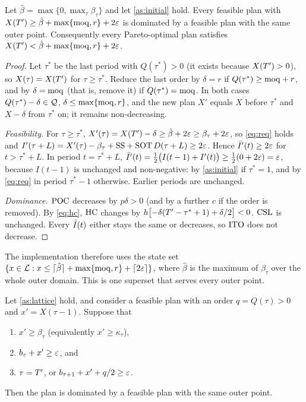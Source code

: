 \begin{lemma}\label{lem:ub}
  Let $\hat\beta=\max\{0,\max_\tau\beta_\tau\}$ and let \cref{as:initial} hold. Every
  feasible plan with $X(T')\ge\hat\beta+\max\{\mathrm{moq},r\}+2\varepsilon$ is dominated by a feasible
  plan with the same outer point. Consequently every Pareto-optimal plan satisfies
  $X(T')<\hat\beta+\max\{\mathrm{moq},r\}+2\varepsilon$.
\end{lemma}

\begin{proof}
  Let $\tau^\ast$ be the last period with $Q(\tau^\ast)>0$ (it exists because
  $X(T')>0$), so $X(\tau)=X(T')$ for $\tau\ge\tau^\ast$. Reduce the last order by
  $\delta=r$ if $Q(\tau^\ast)\ge\mathrm{moq}+r$, and by $\delta=\mathrm{moq}$ (that is, remove it) if
  $Q(\tau^\ast)=\mathrm{moq}$. In both cases $Q(\tau^\ast)-\delta\in\mathcal{Q}$, $\delta\le\max\{\mathrm{moq},r\}$,
  and the new plan $X'$ equals $X$ before $\tau^\ast$ and $X-\delta$ from $\tau^\ast$ on;
  it remains non-decreasing.

  \emph{Feasibility.} For $\tau\ge\tau^\ast$,
  $X'(\tau)=X(T')-\delta\ge\hat\beta+2\varepsilon\ge\beta_\tau+2\varepsilon$, so \eqref{eq:req} holds and
  $I'(\tau+L)=X'(\tau)-\beta_\tau+\mathrm{SS}+\mathrm{SOT}\,D(\tau+L)\ge 2\varepsilon$. Hence
  $\bar I'(t)\ge2\varepsilon$ for $t>\tau^\ast+L$. In period $t=\tau^\ast+L$,
  $\bar I'(t)=\tfrac12\bigl(I(t-1)+I'(t)\bigr)\ge\tfrac12(0+2\varepsilon)=\varepsilon$, because $I(t-1)$
  is unchanged and non-negative: by \cref{as:initial} if $\tau^\ast=1$, and by
  \eqref{eq:req} in period $\tau^\ast-1$ otherwise. Earlier periods are unchanged.

  \emph{Dominance.} $\mathrm{POC}$ decreases by $p\delta>0$ (and by a further $c$ if the order is
  removed). By \eqref{eq:hc}, $\mathrm{HC}$ changes by
  $h\bigl[-\delta(T'-\tau^\ast+1)+\delta/2\bigr]<0$. $\mathrm{CSL}$ is unchanged. Every
  $\bar I(t)$ either stays the same or decreases, so $\mathrm{ITO}$ does not decrease.
\end{proof}

The implementation therefore uses the state set
$\{x\in\mathcal{L} : x\le\lceil\hat\beta\rceil+\max\{\mathrm{moq},r\}+\lceil2\varepsilon\rceil\}$, where
$\hat\beta$ is the maximum of $\beta_\tau$ over the whole outer domain. This is one
superset that serves every outer point.

\begin{lemma}\label{lem:D}
  Let \cref{as:lattice} hold, and consider a feasible plan with an order $q=Q(\tau)>0$ and
  $x'=X(\tau-1)$. Suppose that
  \begin{enumerate}[label=(\alph*),nosep]
    \item $x'\ge\beta_\tau$ (equivalently $x'\ge\kappa_\tau$),
    \item $b_\tau+x'\ge\varepsilon$, and
    \item $\tau=T'$, or $b_{\tau+1}+x'+q/2\ge\varepsilon$.
  \end{enumerate}
  Then the plan is dominated by a feasible plan with the same outer point.
\end{lemma}

